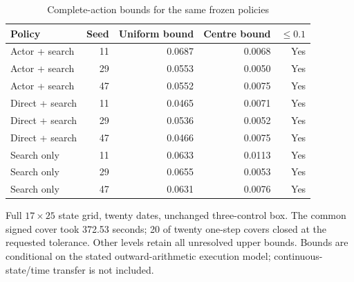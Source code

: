 \begin{table}[htbp]
\centering\small\setlength{\tabcolsep}{4pt}
\caption{Complete-action bounds for the same frozen policies}\label{tab:r9common}
\begin{tabular}{lrrrr}
\toprule
Policy & Seed & Uniform bound & Centre bound & $\leq0.1$ \\
\midrule
Actor + search & 11 & 0.0687 & 0.0068 & Yes \\
Actor + search & 29 & 0.0553 & 0.0050 & Yes \\
Actor + search & 47 & 0.0552 & 0.0075 & Yes \\
Direct + search & 11 & 0.0465 & 0.0071 & Yes \\
Direct + search & 29 & 0.0536 & 0.0052 & Yes \\
Direct + search & 47 & 0.0466 & 0.0075 & Yes \\
Search only & 11 & 0.0633 & 0.0113 & Yes \\
Search only & 29 & 0.0655 & 0.0053 & Yes \\
Search only & 47 & 0.0631 & 0.0076 & Yes \\
\bottomrule
\end{tabular}
\par\vspace{3pt}\begin{minipage}{0.97\linewidth}\footnotesize Full $17\times25$ state grid, twenty dates, unchanged three-control box. The common signed cover took 372.53 seconds; 20 of twenty one-step covers closed at the requested tolerance. Other levels retain all unresolved upper bounds. Bounds are conditional on the stated outward-arithmetic execution model; continuous-state/time transfer is not included.\end{minipage}
\end{table}
